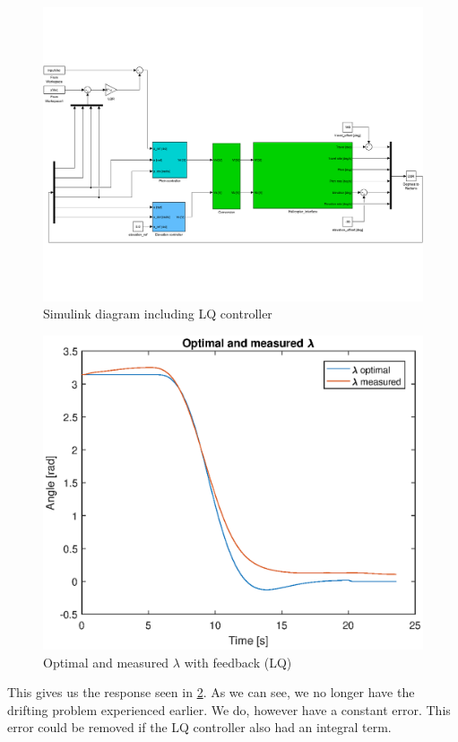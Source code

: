 \begin{figure}
    \includegraphics[width=\textwidth]{ex3sim.pdf}
    \caption{Simulink diagram including LQ controller}
    \label{fig:simulink_LQ}
\end{figure}

\begin{figure}
    \includegraphics{optimal_and_measured_lambda_ex3.eps}
    \caption{Optimal and measured $\lambda$ with feedback (LQ)}
    \label{fig:opt_meas_lambda_ex3}
\end{figure}

This gives us the response seen in \cref{fig:opt_meas_lambda_ex3}. As we can see, we no longer have the drifting problem experienced earlier. We do, however have a constant error. This error could be removed if the LQ controller also had an integral term.



